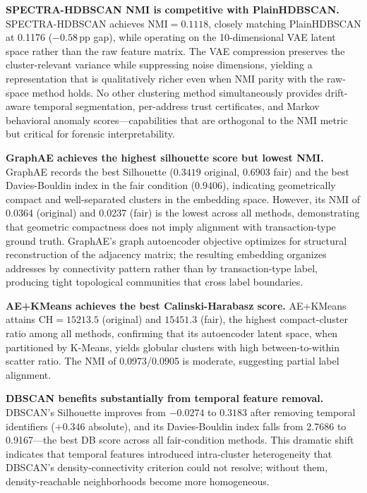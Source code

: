 \documentclass[journal]{IEEEtran}
\begin{document}
\textbf{SPECTRA-HDBSCAN NMI is competitive with PlainHDBSCAN.}
SPECTRA-HDBSCAN achieves $\text{NMI} = \num{0.1118}$, closely matching
PlainHDBSCAN at \num{0.1176} ($-\num{0.58}$\,pp gap), while operating on
the 10-dimensional VAE latent space rather than the raw feature matrix.
The VAE compression preserves the cluster-relevant variance while
suppressing noise dimensions, yielding a representation that is
qualitatively richer even when NMI parity with the raw-space method holds.
No other clustering method simultaneously provides drift-aware temporal
segmentation, per-address trust certificates, and Markov behavioral
anomaly scores---capabilities that are orthogonal to the NMI metric
but critical for forensic interpretability.

\textbf{GraphAE achieves the highest silhouette score but lowest NMI.}
GraphAE records the best Silhouette ($\num{0.3419}$ original,
$\num{0.6903}$ fair) and the best Davies-Bouldin index in the fair condition
($\num{0.9406}$), indicating geometrically compact and well-separated
clusters in the embedding space.
However, its NMI of \num{0.0364} (original) and \num{0.0237} (fair) is the
lowest across all methods, demonstrating that geometric compactness does
not imply alignment with transaction-type ground truth.
GraphAE's graph autoencoder objective optimizes for structural
reconstruction of the adjacency matrix; the resulting embedding organizes
addresses by connectivity pattern rather than by transaction-type label,
producing tight topological communities that cross label boundaries.

\textbf{AE+KMeans achieves the best Calinski-Harabasz score.}
AE+KMeans attains $\text{CH} = \num{15213.5}$ (original) and
$\num{15451.3}$ (fair), the highest compact-cluster ratio among all methods,
confirming that its autoencoder latent space, when partitioned by K-Means,
yields globular clusters with high between-to-within scatter ratio.
The NMI of \num{0.0973}/\num{0.0905} is moderate, suggesting partial label
alignment.

\textbf{DBSCAN benefits substantially from temporal feature removal.}
DBSCAN's Silhouette improves from $-\num{0.0274}$ to $\num{0.3183}$ after
removing temporal identifiers ($+\num{0.346}$ absolute), and its
Davies-Bouldin index falls from \num{2.7686} to \num{0.9167}---the best
DB score across all fair-condition methods.
This dramatic shift indicates that temporal features introduced intra-cluster
heterogeneity that DBSCAN's density-connectivity criterion could not resolve;
without them, density-reachable neighborhoods become more homogeneous.
\end{document}
